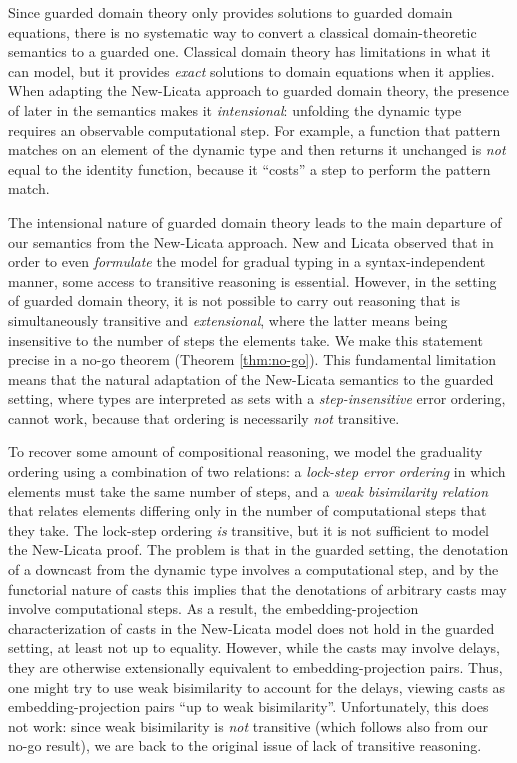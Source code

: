 Since guarded domain theory only provides solutions to guarded domain equations,
there is no systematic way to convert a classical domain-theoretic semantics to
a guarded one.  Classical domain theory has limitations in what it can model,
but it provides \emph{exact} solutions to domain equations when it applies. When
adapting the New-Licata approach to guarded domain theory, the presence of later
in the semantics makes it \emph{intensional}: unfolding the dynamic type
requires an observable computational step. For example, a function that pattern
matches on an element of the dynamic type and then returns it unchanged is
\emph{not} equal to the identity function, because it ``costs'' a step to
perform the pattern match.


The intensional nature of guarded domain theory leads to the main departure of
our semantics from the New-Licata approach. New and Licata observed that
in order to even \emph{formulate} the model for gradual typing in a
syntax-independent manner, some access to transitive reasoning is essential.
%
However, in the setting of guarded domain theory, it is not possible to carry
out reasoning that is simultaneously transitive and \emph{extensional}, where
the latter means being insensitive to the number of steps the elements take. We
make this statement precise in a no-go theorem (Theorem \ref{thm:no-go}). This fundamental
limitation means that the natural adaptation of the New-Licata semantics to the
guarded setting, where types are interpreted as sets with a
\emph{step-insensitive} error ordering, cannot work, because that ordering is
necessarily \emph{not} transitive.

To recover some amount of compositional reasoning, we model the graduality
ordering using a combination of two relations: a \emph{lock-step error ordering}
in which elements must take the same number of steps, and a \emph{weak
bisimilarity relation} that relates elements differing only in the number of
computational steps that they take. The lock-step ordering \emph{is} transitive,
but it is not sufficient to model the New-Licata proof. The problem is that in
the guarded setting, the denotation of a downcast from the dynamic type involves
a computational step, and by the functorial nature of casts this implies that
the denotations of arbitrary casts may involve computational steps. As a result,
the embedding-projection characterization of casts in the New-Licata model does
not hold in the guarded setting, at least not up to equality.
%
However, while the casts may involve delays, they are otherwise extensionally
equivalent to embedding-projection pairs. Thus, one might try to use weak
bisimilarity to account for the delays, viewing casts as embedding-projection
pairs ``up to weak bisimilarity''. Unfortunately, this does not work: since weak
bisimilarity is \emph{not} transitive (which follows also from our no-go
result), we are back to the original issue of lack of transitive reasoning.

